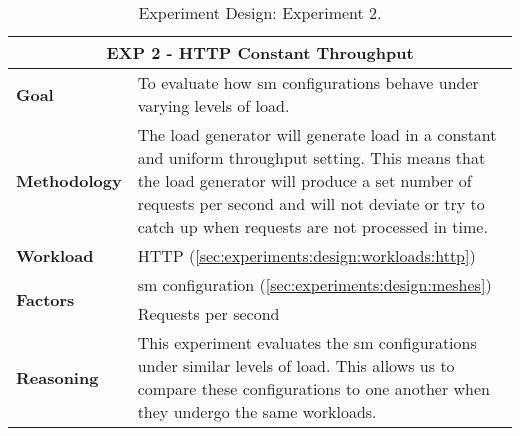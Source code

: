 \begin{table}[!t]
    \centering

    \begin{tabularx}{\textwidth}{l X}
    
        \toprule
        \multicolumn{2}{c}{\textbf{EXP 2 - HTTP Constant Throughput}}  \\
        \toprule
        
        \textbf{Goal}
        & To evaluate how \gls{sm} configurations behave under varying levels of load. \\
        \midrule
        
        \textbf{Methodology}
        & The load generator will generate load in a constant and uniform throughput setting. This means that the load generator will produce a set number of requests per second and will not deviate or try to catch up when requests are not processed in time.  \\
        \midrule
        
        \textbf{Workload} 
        & HTTP (\cref{sec:experiments:design:workloads:http}) \\
        \midrule

        \multirow{2}{*}{\textbf{Factors}} 
        & \Gls{sm} configuration (\cref{sec:experiments:design:meshes}) \\
        & Requests per second \\
        \midrule
        
        \textbf{Reasoning}
        & This experiment evaluates the \gls{sm} configurations under similar levels of load. This allows us to compare these configurations to one another when they undergo the same workloads.  \\

        \bottomrule

    \end{tabularx}
    \caption[Experiment Design: Experiment 2.]{Experiment Design: Experiment 2.}
    \label{tab:experiment:design:02}
\end{table}